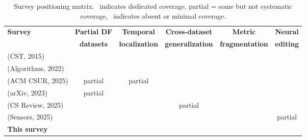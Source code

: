 \documentclass[journal]{IEEEtran}
\newcommand{\cmark}{\ding{51}}
\newcommand{\xmark}{\ding{55}}
\begin{document}
\begin{table}[t]
\centering
\caption{Survey positioning matrix. \cmark\ indicates dedicated coverage, partial = some but not systematic coverage, \xmark\ indicates absent or minimal coverage.}
\label{tab:survey_positioning}
\small
\begin{tabular}{lccccc}
\toprule
\textbf{Survey} & \textbf{Partial DF} & \textbf{Temporal} & \textbf{Cross-dataset} & \textbf{Metric} & \textbf{Neural} \\
 & \textbf{datasets} & \textbf{localization} & \textbf{generalization} & \textbf{fragmentation} & \textbf{editing} \\
\midrule
\cite{wu2015spoofing} (CST, 2015) & \xmark & \xmark & \xmark & \xmark & \xmark \\
\cite{almutairi2022review} (Algorithms, 2022) & \xmark & \xmark & \xmark & \xmark & \xmark \\
\cite{li2025survey} (ACM CSUR, 2025) & partial & partial & \xmark & \xmark & \xmark \\
\cite{yi2023survey} (arXiv, 2023) & partial & \xmark & \xmark & \xmark & \xmark \\
\cite{pham2025survey} (CS Review, 2025) & \xmark & \xmark & partial & \xmark & \xmark \\
\cite{zhang2025audiosurvey} (Sensors, 2025) & \xmark & \xmark & \xmark & \xmark & partial \\
\textbf{This survey} & \cmark & \cmark & \cmark & \cmark & \cmark \\
\bottomrule
\end{tabular}
\end{table}
\end{document}
